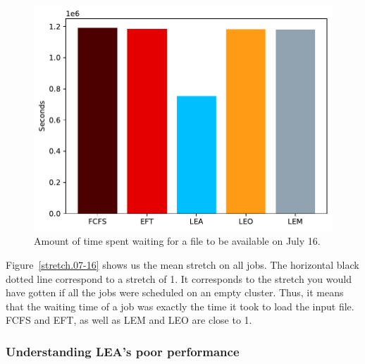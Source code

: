 \documentclass[conference,10pt]{IEEEtran}
\begin{document}
\begin{figure}[tb]\centering\includegraphics[scale=0.47]{../MBSS/plot/Results_FCFS_Score_Backfill_2022-07-16->2022-07-16_V10000_Total_waiting_for_a_load_time_and_transfer_time_450_128_32_256_4_1024.pdf}\caption{Amount of time spent waiting for a file to be available on July 16.}\label{load.07-16}\end{figure}

Figure~\ref{stretch.07-16} shows us the mean stretch on all jobs.
The horizontal black dotted line correspond to a stretch of 1.
It corresponds to the stretch you would have gotten if all the jobs 
were scheduled on an empty cluster.
Thus, it means that the waiting time of a job was exactly
the time it took to load the input file.
FCFS and EFT, as well as LEM and LEO are close to 1.

\subsubsection{Understanding LEA's poor performance}
\end{document}
